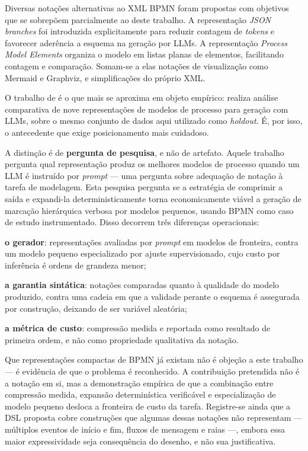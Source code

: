 Diversas notações alternativas ao XML BPMN foram propostas com objetivos que se sobrepõem parcialmente ao deste trabalho. A representação \textit{JSON branches} \cite{kopke2024efficient} foi introduzida explicitamente para reduzir contagem de \textit{tokens} e favorecer aderência a esquema na geração por LLMs. A representação \textit{Process Model Elements} \cite{voelter2024multimodal} organiza o modelo em listas planas de elementos, facilitando contagem e comparação. Somam-se a elas notações de visualização como Mermaid e Graphviz, e simplificações do próprio XML.

O trabalho de  é o que mais se aproxima em objeto empírico: realiza análise comparativa de nove representações de modelos de processo para geração com LLMs, sobre o mesmo conjunto de dados aqui utilizado como \textit{holdout}. É, por isso, o antecedente que exige posicionamento mais cuidadoso.

A distinção é de \textbf{pergunta de pesquisa}, e não de artefato. Aquele trabalho pergunta qual representação produz os melhores modelos de processo quando um LLM é instruído por \textit{prompt} — uma pergunta sobre adequação de notação à tarefa de modelagem. Esta pesquisa pergunta se a estratégia de comprimir a saída e expandi-la deterministicamente torna economicamente viável a geração de marcação hierárquica verbosa por modelos pequenos, usando BPMN como caso de estudo instrumentado. Disso decorrem três diferenças operacionais:

\begin{alineas}
	\item \textbf{o gerador}: representações avaliadas por \textit{prompt} em modelos de fronteira, contra um modelo pequeno especializado por ajuste supervisionado, cujo custo por inferência é ordens de grandeza menor;
	\item \textbf{a garantia sintática}: notações comparadas quanto à qualidade do modelo produzido, contra uma cadeia em que a validade perante o esquema é assegurada por construção, deixando de ser variável aleatória;
	\item \textbf{a métrica de custo}: compressão medida e reportada como resultado de primeira ordem, e não como propriedade qualitativa da notação.
\end{alineas}

Que representações compactas de BPMN já existam não é objeção a este trabalho — é evidência de que o problema é reconhecido. A contribuição pretendida não é a notação em si, mas a demonstração empírica de que a combinação entre compressão medida, expansão determinística verificável e especialização de modelo pequeno desloca a fronteira de custo da tarefa. Registre-se ainda que a DSL proposta cobre construções que algumas dessas notações não representam — múltiplos eventos de início e fim, fluxos de mensagem e raias —, embora essa maior expressividade seja consequência do desenho, e não sua justificativa.


